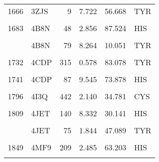 \begin{table}
\begin{tabular}{llrrrl}
			1666 & 3ZJS & 9 & 7.722 & 56.668 & TYR\\
			\cellcolor{gray!6}{1679} & \cellcolor{gray!6}{4B8N} & \cellcolor{gray!6}{39} & \cellcolor{gray!6}{6.321} & \cellcolor{gray!6}{69.096} & \cellcolor{gray!6}{TYR}\\
			1683 & 4B8N & 48 & 2.856 & 87.524 & HIS\\
			\cellcolor{gray!6}{1699} & \cellcolor{gray!6}{4B8N} & \cellcolor{gray!6}{71} & \cellcolor{gray!6}{1.755} & \cellcolor{gray!6}{70.933} & \cellcolor{gray!6}{HIS}\\
			\addlinespace
			1705 & 4B8N & 79 & 8.264 & 10.051 & TYR\\
			\cellcolor{gray!6}{1712} & \cellcolor{gray!6}{4CDP} & \cellcolor{gray!6}{193} & \cellcolor{gray!6}{2.409} & \cellcolor{gray!6}{74.031} & \cellcolor{gray!6}{HIS}\\
			1732 & 4CDP & 315 & 0.578 & 83.078 & TYR\\
			\cellcolor{gray!6}{1740} & \cellcolor{gray!6}{4CDP} & \cellcolor{gray!6}{83} & \cellcolor{gray!6}{6.916} & \cellcolor{gray!6}{82.362} & \cellcolor{gray!6}{HIS}\\
			1741 & 4CDP & 87 & 9.545 & 73.878 & HIS\\
			\addlinespace
			\cellcolor{gray!6}{1768} & \cellcolor{gray!6}{4I3Q} & \cellcolor{gray!6}{307} & \cellcolor{gray!6}{5.653} & \cellcolor{gray!6}{50.994} & \cellcolor{gray!6}{TYR}\\
			1796 & 4I3Q & 442 & 2.140 & 34.781 & CYS\\
			\cellcolor{gray!6}{1807} & \cellcolor{gray!6}{4JET} & \cellcolor{gray!6}{135} & \cellcolor{gray!6}{8.219} & \cellcolor{gray!6}{65.297} & \cellcolor{gray!6}{HIS}\\
			1809 & 4JET & 140 & 8.332 & 30.141 & HIS\\
			\cellcolor{gray!6}{1826} & \cellcolor{gray!6}{4JET} & \cellcolor{gray!6}{55} & \cellcolor{gray!6}{2.434} & \cellcolor{gray!6}{11.357} & \cellcolor{gray!6}{TYR}\\
			\addlinespace
			1830 & 4JET & 75 & 1.844 & 47.089 & TYR\\
			\cellcolor{gray!6}{1835} & \cellcolor{gray!6}{4JET} & \cellcolor{gray!6}{81} & \cellcolor{gray!6}{3.516} & \cellcolor{gray!6}{54.183} & \cellcolor{gray!6}{HIS}\\
			1849 & 4MF9 & 209 & 2.485 & 63.203 & HIS\\
			\cellcolor{gray!6}{1850} & \cellcolor{gray!6}{4MF9} & \cellcolor{gray!6}{210} & \cellcolor{gray!6}{9.455} & \cellcolor{gray!6}{50.161} & \cellcolor{gray!6}{HIS}\\

\end{tabular}
\end{table}
